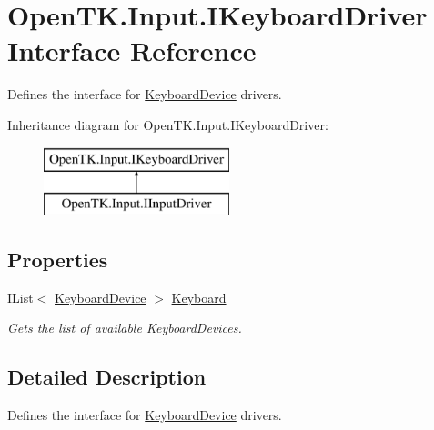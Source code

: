 \hypertarget{interface_open_t_k_1_1_input_1_1_i_keyboard_driver}{\section{Open\-T\-K.\-Input.\-I\-Keyboard\-Driver Interface Reference}
\label{interface_open_t_k_1_1_input_1_1_i_keyboard_driver}
}


Defines the interface for \hyperlink{class_open_t_k_1_1_input_1_1_keyboard_device}{Keyboard\-Device} drivers.  


Inheritance diagram for Open\-T\-K.\-Input.\-I\-Keyboard\-Driver\-:\begin{figure}[H]
\begin{center}
\leavevmode
\includegraphics[height=2.000000cm]{interface_open_t_k_1_1_input_1_1_i_keyboard_driver}
\end{center}
\end{figure}
\subsection*{Properties}
\begin{DoxyCompactItemize}
\item 
I\-List$<$ \hyperlink{class_open_t_k_1_1_input_1_1_keyboard_device}{Keyboard\-Device} $>$ \hyperlink{interface_open_t_k_1_1_input_1_1_i_keyboard_driver_a2181af987484d7afd98fbd8266c7940b}{Keyboard}
\begin{DoxyCompactList}\small\item\em Gets the list of available Keyboard\-Devices. \end{DoxyCompactList}\end{DoxyCompactItemize}


\subsection{Detailed Description}
Defines the interface for \hyperlink{class_open_t_k_1_1_input_1_1_keyboard_device}{Keyboard\-Device} drivers. 



